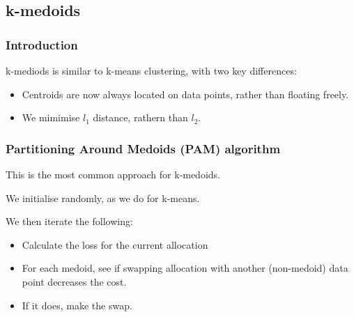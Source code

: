 
\subsection{k-medoids}

\subsubsection{Introduction}

k-mediods is similar to k-means clustering, with two key differences:

\begin{itemize}
\item Centroids are now always located on data points, rather than floating freely.
\item We mimimise \(l_1\) distance, rathern than \(l_2\).
\end{itemize}

\subsubsection{Partitioning Around Medoids (PAM) algorithm}

This is the most common approach for k-medoids.

We initialise randomly, as we do for k-means.

We then iterate the following:

\begin{itemize}
\item Calculate the loss for the current allocation
\item For each medoid, see if swapping allocation with another (non-medoid) data point decreases the cost.
\item If it does, make the swap.
\end{itemize}

